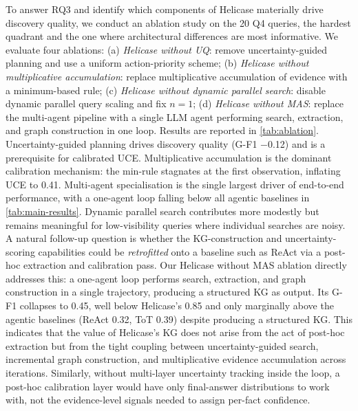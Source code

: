 \documentclass{article}
\begin{document}
To answer RQ3 and identify which components of Helicase materially drive discovery quality, we conduct an ablation study on the 20 Q4 queries, the hardest quadrant and the one where architectural differences are most informative. We evaluate four ablations: (a) \textit{Helicase without UQ}: remove uncertainty-guided planning and use a uniform action-priority scheme; (b) \textit{Helicase without multiplicative accumulation}: replace multiplicative accumulation of evidence with a minimum-based rule; (c) \textit{Helicase without dynamic parallel search}: disable dynamic parallel query scaling and fix $n=1$; (d) \textit{Helicase without MAS}: replace the multi-agent pipeline with a single LLM agent performing search, extraction, and graph construction in one loop. Results are reported in \autoref{tab:ablation}. Uncertainty-guided planning drives discovery quality (G-F1 $-$0.12) and is a prerequisite for calibrated UCE. Multiplicative accumulation is the dominant calibration mechanism: the min-rule stagnates at the first observation, inflating UCE to 0.41. Multi-agent specialisation is the single largest driver of end-to-end performance, with a one-agent loop falling below all agentic baselines in \autoref{tab:main-results}. Dynamic parallel search contributes more modestly but remains meaningful for low-visibility queries where individual searches are noisy. A natural follow-up question is whether the KG-construction and uncertainty-scoring capabilities could be \textit{retrofitted} onto a baseline such as ReAct via a post-hoc extraction and calibration pass. Our Helicase without MAS ablation directly addresses this: a one-agent loop performs search, extraction, and graph construction in a single trajectory, producing a structured KG as output. Its G-F1 collapses to 0.45, well below Helicase's 0.85 and only marginally above the agentic baselines (ReAct 0.32, ToT 0.39) despite producing a structured KG. This indicates that the value of Helicase's KG does not arise from the act of post-hoc extraction but from the tight coupling between uncertainty-guided search, incremental graph construction, and multiplicative evidence accumulation across iterations. Similarly, without multi-layer uncertainty tracking inside the loop, a post-hoc calibration layer would have only final-answer distributions to work with, not the evidence-level signals needed to assign per-fact confidence.
\end{document}
